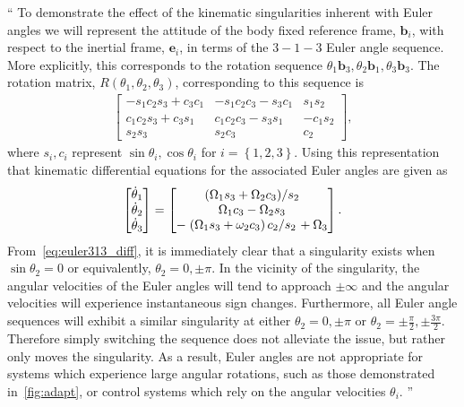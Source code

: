 \documentclass[11pt]{article}
\newcommand{\braces}[1]{\ensuremath{\left\{ #1 \right\}}}
\newcommand{\parenth}[1]{\ensuremath{\left( #1 \right)}}
\newcommand{\vecbf}[1]{\bm{#1}}
\newcommand{\slfrac}[2]{\left.#1\middle/#2\right.}
\newenvironment{correction}{\begin{list}{}{\setlength{\leftmargin}{1cm}\setlength{\rightmargin}{1cm}}\vspace{\parsep}\item[]``}{''\end{list}}
\begin{document}
\begin{enumerate}
\begin{correction}
To demonstrate the effect of the kinematic singularities inherent with Euler angles we will represent the attitude of the body fixed reference frame, \( \vecbf{b}_i \), with respect to the inertial frame, \( \vecbf{e}_i\), in terms of the \( 3-1-3\) Euler angle sequence.
More explicitly, this corresponds to the rotation sequence \( \theta_1 \vecbf{b}_3 , \theta_2 \vecbf{b}_1, \theta_3 \vecbf{b}_3 \).
The rotation matrix, \( R(\theta_1, \theta_2, \theta_3) \), corresponding to this sequence is 
\begin{align}
    \begin{bmatrix}
        -s_1 c_2 s_3 + c_3 c_1 & -s_1 c_2 c_3 - s_3 c_1 & s_1s_2 \\
        c_1 c_2 s_3 + c_3 s_1 & c_1 c_2 c_3 - s_3 s_1 & - c_1 s_2 \\
        s_2 s_3 & s_2 c_3 & c_2
    \end{bmatrix} ,
\end{align}
where \( s_i, c_i \) represent \( \sin \theta_i, \cos \theta_i \) for \( i = \braces{1,2,3}\).
Using this representation that kinematic differential equations for the associated Euler angles are given as
\begin{align}
    \begin{bmatrix}
        \dot{\theta}_1 \\ \dot{\theta}_2 \\ \dot{\theta}_3 
    \end{bmatrix}
    =
    \begin{bmatrix}
        \slfrac{\parenth{\Omega_1 s_3 + \Omega_2 c_3}}{s_2} \\
        \Omega_1 c_3 - \Omega_2 s_3 \\
        -\slfrac{\parenth{\Omega_1 s_3 + \omega_2 c_3}c_2}{s_2} + \Omega_3
    \end{bmatrix} .
\end{align}
From~\cref{eq:euler313_diff}, it is immediately clear that a singularity exists when \( \sin \theta_2 = 0 \) or equivalently, \( \theta_2 = 0, \pm \pi \). 
In the vicinity of the singularity, the angular velocities of the Euler angles will tend to approach \( \pm \infty \) and the angular velocities will experience instantaneous sign changes.
Furthermore, all Euler angle sequences will exhibit a similar singularity at either \( \theta_2 = 0, \pm \pi \) or \( \theta_2 = \pm \frac{\pi}{2}, \pm \frac{3\pi}{2} \).
Therefore simply switching the sequence does not alleviate the issue, but rather only moves the singularity.
As a result, Euler angles are not appropriate for systems which experience large angular rotations, such as those demonstrated in~\cref{fig:adapt}, or control systems which rely on the angular velocities \( \theta_i \).
\end{correction}


\end{enumerate}
\end{document}
